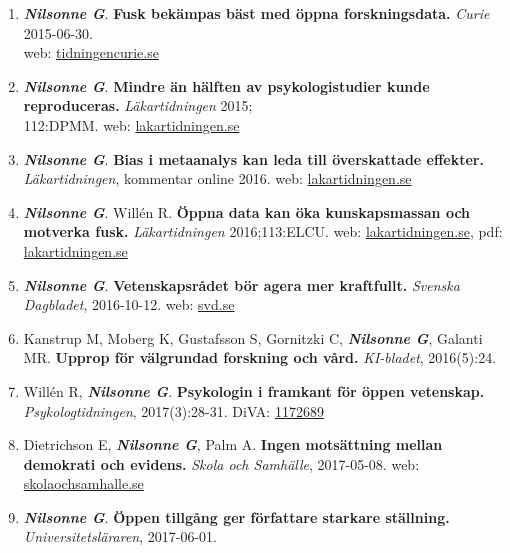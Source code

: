 \documentclass[10pt]{article}
\begin{document}
\begin{enumerate}[nolistsep]
\item \textbf{\textit{Nilsonne G}}. \textbf{Fusk bekämpas bäst med öppna forskningsdata.} \emph{Curie} 2015-06-30.\\
web: \href{http://www.tidningencurie.se/22/kronikor/kronikor/2015-06-30-gustav-nilsonne-fusk-bekampas-bast-med-oppna-forskningsdata.html}{tidningencurie.se}
\item \textbf{\textit{Nilsonne G}}. \textbf{Mindre än hälften av psykologistudier kunde reproduceras.} \emph{Läkartidningen} 2015;\\112:DPMM.
web: \href{http://www.lakartidningen.se/Klinik-och-vetenskap/Nya-ron/2015/09/Mindre-an-halften-av-psykologistudier-kunde-upprepas/}{lakartidningen.se}
\item \textbf{\textit{Nilsonne G}}. \textbf{Bias i metaanalys kan leda till överskattade effekter.} \emph{Läkartidningen}, kommentar online 2016.
web: \href{http://lakartidningen.se/Klinik-och-vetenskap/Nya-ron/2015/11/Samband-mellan-inflammation-och-PTSD-granskad-i-metaanalys/\#comments}{lakartidningen.se}
\item \textbf{\textit{Nilsonne G}}. Willén R. \textbf{Öppna data kan öka kunskapsmassan och motverka fusk.} \emph{Läkartidningen} 2016;113:ELCU.
web: \href{http://www.lakartidningen.se/Klinik-och-vetenskap/Kommentar/2016/10/Oppna-data-kan-oka-kunskapsmassan-och-motverka-fusk/}{lakartidningen.se}, pdf: \href{http://www.lakartidningen.se/EditorialFiles/LU/\%5bECLU\%5d/ECLU.pdf}{lakartidningen.se}
\item \textbf{\textit{Nilsonne G}}. \textbf{Vetenskapsrådet bör agera mer kraftfullt.} \emph{Svenska Dagbladet}, 2016-10-12.
web: \href{http://www.svd.se/vetenskapsradet-bor-agera-mer-kraftfullt/om/debatt}{svd.se}
\item Kanstrup M, Moberg K, Gustafsson S, Gornitzki C, \textbf{\textit{Nilsonne G}}, Galanti MR. \textbf{Upprop för välgrundad forskning och vård.} \emph{KI-bladet}, 2016(5):24.
\item Willén R, \textbf{\textit{Nilsonne G}}. \textbf{Psykologin i framkant för öppen vetenskap.} \emph{Psykologtidningen}, 2017(3):28-31.
DiVA: \href{http://www.diva-portal.org/smash/record.jsf?pid=diva2\%3A1172689}{1172689}
\item Dietrichson E, \textbf{\textit{Nilsonne G}}, Palm A. \textbf{Ingen motsättning mellan demokrati och evidens.} \emph{Skola och Samhälle}, 2017-05-08.
web: \href{http://www.skolaochsamhalle.se/flode/skola/elias-dietrichson-med-flera-ingen-motsattning-mellan-demokrati-och-evidens/}{skolaochsamhalle.se}
\item \textbf{\textit{Nilsonne G}}. \textbf{Öppen tillgång ger författare starkare ställning.} \emph{Universitetsläraren}, 2017-06-01.

\end{enumerate}
\end{document}
